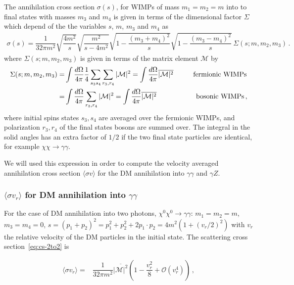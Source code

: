 The annihilation cross section $\sigma (s) $, for WIMPs of mass $m_1=m_2=m$ into to final states with masses $m_3$ and $m_4$ is given in terms of the dimensional factor $\Sigma$ which depend of the the variables $s$, $m$, $m_3$ and $m_4$ as~\cite{Chen:2013gya}
%
\begin{align}
\label{eq:cs-2to2}
\sigma(s)=\dfrac{1}{32\pi m^2}\sqrt{\dfrac{4m^2}{s}}\sqrt{\dfrac{m^2}{s-4m^2}}\sqrt{1-\dfrac{(m_3+m_4)^2}{s}}\sqrt{1-\dfrac{(m_3-m_4)^2}{s}}\,
\Sigma(s;m,m_2,m_3)\,.
\end{align} 
%
where $\Sigma(s;m,m_2,m_3)$ is given in terms of the matrix element $\mathcal{M}$ by
%
\begin{align}
\Sigma(s;m,m_2,m_3)
= & \int \dfrac{d\Omega}{4\pi}\dfrac{1}{4}\sum_{s_3s_4}\sum_{r_3,r_4}|\mathcal{M}|^2
=   \int \dfrac{d\Omega}{4\pi}\overline{|\mathcal{M}|^2}  \hspace{1.0 cm} \text{fermionic WIMPs}\\
= & \int \dfrac{d\Omega}{4\pi}\sum_{r_3,r_4}|\mathcal{M}|^2 
=   \int \dfrac{d\Omega}{4\pi}\overline{|\mathcal{M}|^2} \hspace{2.0 cm} \text{bosonic WIMPs}\,,
\end{align}
%
where initial spins states $s_3 , s_4$ are averaged over the fermionic WIMPs, and polarization $r_3 , r_4$ of the final states bosons are summed over. The integral in the solid angles has an extra factor of $1/2$ if the two final state particles are identical, for example $\chi\chi\to\gamma\gamma$.  

We will used this expression in order to compute the velocity averaged annihilation cross section $\langle \sigma v \rangle$ for the DM annihilation into $\gamma\gamma$ and $\gamma Z$. 

\subsubsection{$\langle\sigma v_r\rangle$ for DM annihilation into $\gamma\gamma$}
For the case of DM annihilation into two photons, $\chi^0\chi^0\rightarrow\gamma\gamma$: $m_1=m_2=m$, $m_3=m_4=0$, $s=(p_1+p_2)^2=p_1^2+p_2^2+2p_1\cdot p_2=4m^2(1+(v_r/2)^2)$ with $v_r$ the relative velocity of the DM particles in the initial state.
The scattering cross section~\eqref{eq:cs-2to2} is

\begin{align}
\langle\sigma v_r\rangle=&\dfrac{1}{32\pi m^2}\overline{{|\mathcal{M}|^2}}\left(1-\dfrac{v_r^2}{8}+\mathcal{O}(v_r^4)\right)\,,
\end{align}

